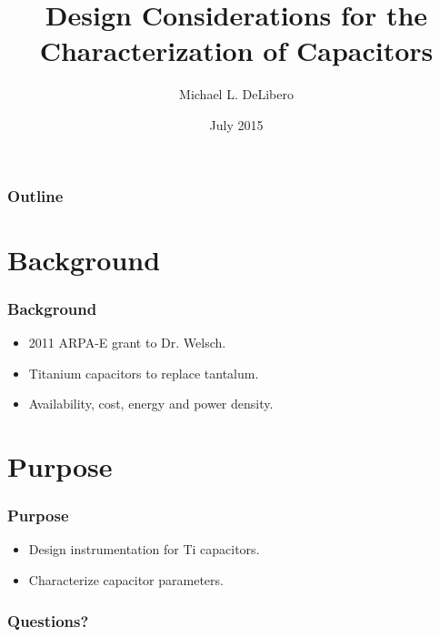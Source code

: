 \documentclass{beamer}
\title{Design Considerations for the Characterization of Capacitors}
\author{Michael L. DeLibero}
\date{July 2015}
\institute[CWRU]{Case Western Reserve University}
\begin{document}
\begin{frame}
    \titlepage
\end{frame}



\begin{frame}
  \frametitle{Outline}
  \tableofcontents[pausesections]
\end{frame}

\section{Background}
\begin{frame}
    \frametitle{Background}
    \begin{itemize}
        \item 2011 ARPA-E grant to Dr. Welsch.
        \item Titanium capacitors to replace tantalum.
        \item Availability, cost, energy and power density.
    \end{itemize}
\end{frame}

\section{Purpose}
\begin{frame}
    \frametitle{Purpose}
    \begin{itemize}
        \item Design instrumentation for Ti capacitors.
        \item Characterize capacitor parameters.
    \end{itemize}
\end{frame}








\begin{frame}
    \frametitle{Questions?}
\end{frame}
\end{document}
